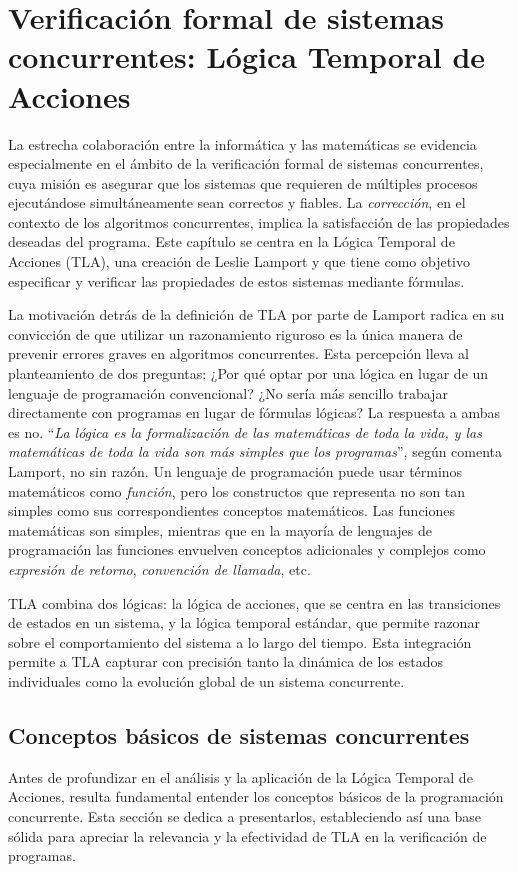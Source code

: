 \chapter{\textbf{Verificación formal de sistemas concurrentes: Lógica Temporal de Acciones}}\label{chapter:tla}
La estrecha colaboración entre la informática y las matemáticas se evidencia especialmente en el ámbito de la verificación formal de sistemas concurrentes, cuya misión es asegurar que los sistemas que requieren de múltiples procesos ejecutándose simultáneamente sean correctos y fiables. La \textit{corrección}, en el contexto de los algoritmos concurrentes, implica la satisfacción de las propiedades deseadas del programa. Este capítulo se centra en la Lógica Temporal de Acciones (TLA), una creación de Leslie Lamport y que tiene como objetivo especificar y verificar las propiedades de estos sistemas mediante fórmulas.

La motivación detrás de la definición de TLA por parte de Lamport radica en su convicción de que utilizar un razonamiento riguroso es la única manera de prevenir errores graves en algoritmos concurrentes. Esta percepción lleva al planteamiento de dos preguntas: ¿Por qué optar por una lógica en lugar de un lenguaje de programación convencional? ¿No sería más sencillo trabajar directamente con programas en lugar de fórmulas lógicas? La respuesta a ambas es no. ``\textit{La lógica es la formalización de las matemáticas de toda la vida, y las matemáticas de toda la vida son más simples que los programas}'', según comenta Lamport, no sin razón. Un lenguaje de programación puede usar términos matemáticos como \textit{función}, pero los constructos que representa no son tan simples como sus correspondientes conceptos matemáticos. Las funciones matemáticas son simples, mientras que en la mayoría de lenguajes de programación las funciones envuelven conceptos adicionales y complejos como \textit{expresión de retorno}, \textit{convención de llamada}, etc.

TLA combina dos lógicas: la lógica de acciones, que se centra en las transiciones de estados en un sistema, y la lógica temporal estándar, que permite razonar sobre el comportamiento del sistema a lo largo del tiempo. Esta integración permite a TLA capturar con precisión tanto la dinámica de los estados individuales como la evolución global de un sistema concurrente.

\section{Conceptos básicos de sistemas concurrentes}\label{section:concurrentprop}
Antes de profundizar en el análisis y la aplicación de la Lógica Temporal de Acciones, resulta fundamental entender los conceptos básicos de la programación concurrente. Esta sección se dedica a presentarlos, estableciendo así una base sólida para apreciar la relevancia y la efectividad de TLA en la verificación de programas.

